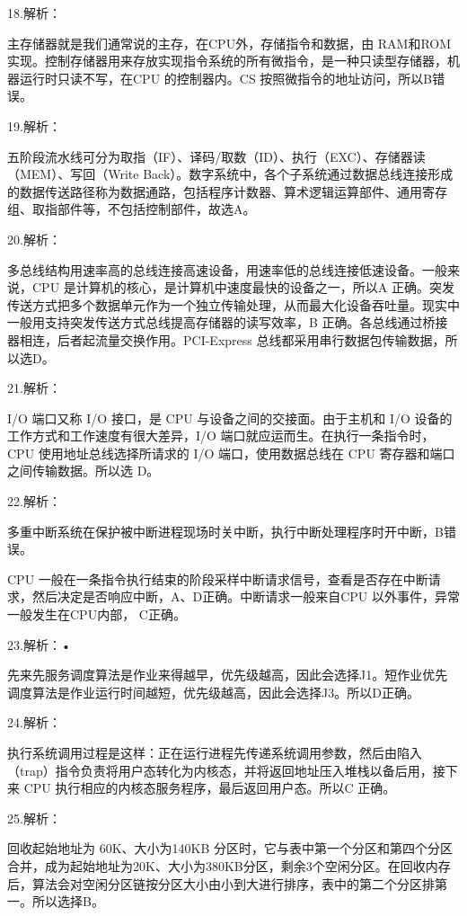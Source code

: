 \documentclass[UTF8,11pt]{ctexart}
\begin{document}
18.解析：


主存储器就是我们通常说的主存，在CPU外，存储指令和数据，由 RAM和ROM实现。控制存储器用来存放实现指令系统的所有微指令，是一种只读型存储器，机器运行时只读不写，在CPU 的控制器内。CS 按照微指令的地址访问，所以B错误。


19.解析：


五阶段流水线可分为取指（IF）、译码/取数（ID）、执行（EXC）、存储器读（MEM）、写回（Write Back）。数字系统中，各个子系统通过数据总线连接形成的数据传送路径称为数据通路，包括程序计数器、算术逻辑运算部件、通用寄存组、取指部件等，不包括控制部件，故选A。


20.解析：


多总线结构用速率高的总线连接高速设备，用速率低的总线连接低速设备。一般来说，CPU 是计算机的核心，是计算机中速度最快的设备之一，所以A 正确。突发传送方式把多个数据单元作为一个独立传输处理，从而最大化设备吞吐量。现实中一般用支持突发传送方式总线提高存储器的读写效率，B 正确。各总线通过桥接器相连，后者起流量交换作用。PCI-Express 总线都采用串行数据包传输数据，所以选D。


21.解析：


I/O 端口又称 I/O 接口，是 CPU 与设备之间的交接面。由于主机和 I/O 设备的工作方式和工作速度有很大差异，I/O 端口就应运而生。在执行一条指令时，CPU 使用地址总线选择所请求的 I/O 端口，使用数据总线在 CPU 寄存器和端口之间传输数据。所以选 D。


22.解析：


多重中断系统在保护被中断进程现场时关中断，执行中断处理程序时开中断，B错误。


CPU 一般在一条指令执行结束的阶段采样中断请求信号，查看是否存在中断请求，然后决定是否响应中断，A、D正确。中断请求一般来自CPU 以外事件，异常一般发生在CPU内部， C正确。


23.解析：•


先来先服务调度算法是作业来得越早，优先级越高，因此会选择J1。短作业优先调度算法是作业运行时间越短，优先级越高，因此会选择J3。所以D正确。


24.解析：


执行系统调用过程是这样：正在运行进程先传递系统调用参数，然后由陷入（trap）指令负责将用户态转化为内核态，并将返回地址压入堆栈以备后用，接下来 CPU 执行相应的内核态服务程序，最后返回用户态。所以C 正确。


25.解析：


回收起始地址为 60K、大小为140KB 分区时，它与表中第一个分区和第四个分区合并，成为起始地址为20K、大小为380KB分区，剩余3个空闲分区。在回收内存后，算法会对空闲分区链按分区大小由小到大进行排序，表中的第二个分区排第一。所以选择B。
\end{document}
